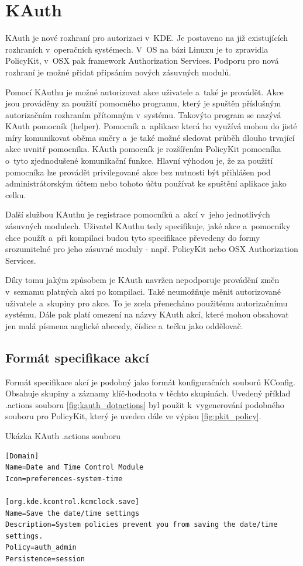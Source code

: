 \section{KAuth}
KAuth je nové rozhraní pro autorizaci v~KDE. Je postaveno na již existujících rozhraních v~operačních systémech. V~OS na bázi Linuxu je to zpravidla PolicyKit, v~OSX pak framework Authorization Services. Podporu pro nová rozhraní je možné přidat připsáním nových zásuvných modulů.

Pomocí KAuthu je možné autorizovat akce uživatele a~také je provádět. Akce jsou prováděny za použití pomocného programu, který je spuštěn příslušným autorizačním rozhraním přítomným v~systému. Takovýto program se nazývá KAuth pomocník (helper). Pomocník a~aplikace která ho využívá mohou do jisté míry komunikovat oběma směry a~je také možné sledovat průběh dlouho trvající akce uvnitř pomocníka. KAuth pomocník je rozšířením PolicyKit pomocníka o~tyto zjednodušené komunikační funkce. Hlavní výhodou je, že za použití pomocníka lze provádět privilegované akce bez nutnosti být přihlášen pod administrátorským účtem nebo tohoto účtu používat ke spuštění aplikace jako celku.

Další službou KAuthu je registrace pomocníků a~akcí v~jeho jednotlivých zásuvných modulech. Uživatel KAuthu tedy specifikuje, jaké akce a~pomocníky chce použít a~při kompilaci budou tyto specifikace převedeny do formy srozumitelné pro jeho zásuvné moduly - např. PolicyKit nebo OSX Authorization Services.

Díky tomu jakým způsobem je KAuth navržen nepodporuje provádění změn v~seznamu platných akcí po kompilaci. Také neumožňuje měnit autorizované uživatele a~skupiny pro akce. To je zcela přenecháno použitému autorizačnímu systému. Dále pak platí omezení na názvy KAuth akcí, které mohou obsahovat jen malá písmena anglické abecedy, číslice a~tečku jako oddělovač.

\subsection*{Formát specifikace akcí}
Formát specifikace akcí je podobný jako formát konfiguračních souborů KConfig. Obsahuje skupiny a záznamy klíč-hodnota v těchto skupinách. Uvedený příklad .actions souboru \ref{fig:kauth_dotactions} byl použit k~vygenerování podobného souboru pro PolicyKit, který je uveden dále ve výpisu \ref{fig:pkit_policy}.

\begin{mylisting}
\caption{Ukázka KAuth .actions souboru}
\label{fig:kauth_dotactions}
\begin{lstlisting}
[Domain]
Name=Date and Time Control Module
Icon=preferences-system-time

[org.kde.kcontrol.kcmclock.save]
Name=Save the date/time settings
Description=System policies prevent you from saving the date/time settings.
Policy=auth_admin
Persistence=session
\end{lstlisting}
\end{mylisting}

